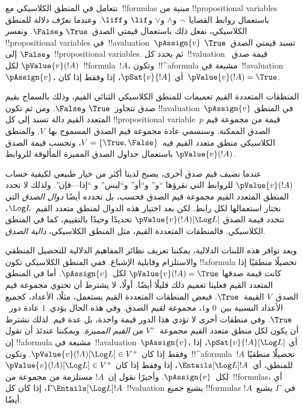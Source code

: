 \documentclass[../../../include/open-logic-section]{subfiles}
\begin{document}


نتعامل في المنطق الكلاسيكي مع~!!{formula}s مبنية من
!!{propositional variable}s باستعمال روابط القضايا~$\lnot$ و$\land$
و$\lor$ و$\lif$ و$\liff$. وعندما نعرّف دلالة للمنطق الكلاسيكي، نفعل
ذلك باستعمال قيمتي الصدق~$\True$ و$\False$. ونفسر
!!{propositional variable}s في~!!a{valuation}~$\pAssign{v}$ تسند
قيمتي الصدق~$\True$ و$\False$ إلى~!!{propositional variable}s. ثم يحدد
كل~!!{valuation} قيمة صدق~$\pValue{v}(!A)$ لكل~!!{formula}~$!A$،
وتكون~!!^a{formula} مشبعة في~!!a{valuation}~$\pAssign{v}$، أي
$\pSat{v}{!A}$، إذا وفقط إذا كان~$\pValue{v}(!A) = \True$.

المنطقات المتعددة القيم تعميمات للمنطق الكلاسيكي الثنائي القيم، وذلك
بالسماح بقيم صدق تتجاوز~$\True$ و$\False$. ومن ثم تكون
!!a{valuation}~$\pAssign{v}$ في المنطق المتعدد القيم دالة تسند إلى كل
!!{propositional variable}~$p$ قيمة من مجموعة قيم الصدق الممكنة.
وسنسمي عادة مجموعة قيم الصدق المسموح بها~$V$. والمنطق الكلاسيكي منطق
متعدد القيم فيه~$V = \{\True, \False\}$، وتحسب قيمة الصدق
$\pValue{v}(!A)$ باستعمال جداول الصدق المميزة المألوفة للروابط.

عندما نضيف قيم صدق أخرى، يصبح لدينا أكثر من خيار طبيعي لكيفية حساب
$\pValue{v}(!A)$ للروابط التي نقرؤها ``و'' و``أو'' و``ليس'' و
``إذا---فإن''. ولذلك لا تحدد المنطق المتعدد القيم مجموعة قيم الصدق
فحسب، بل تحدده أيضًا \emph{دوال الصدق} التي نختار استعمالها لكل رابط.
لكن بعد اختيار هذه الدوال لمنطق متعدد القيم~$\Log L$، تتحدد قيمة الصدق
$\pValue{v}(!A)[\Log L]$ تحديدًا وحيدًا بالتقييم، كما في المنطق
الكلاسيكي. فالمنطقات المتعددة القيم، مثل المنطق الكلاسيكي،
\emph{دالية الصدق}.

وبعد توافر هذه اللبنات الدلالية، يمكننا تعريف نظائر المفاهيم الدلالية
للتحصيل المنطقي والاستلزام وقابلية الإشباع. ففي المنطق الكلاسيكي تكون
!!a{formula} تحصيلًا منطقيًا إذا كانت قيمة صدقها
$\pValue{v}(!A) = \True$ لكل~$\pAssign{v}$. أما في المنطق المتعدد
القيم فعلينا تعميم ذلك قليلًا أيضًا. أولًا، لا يشترط أن تحتوي مجموعة
قيم الصدق~$V$ القيمة~$\True$. فبعض المنطقات المتعددة القيم يستعمل،
مثلًا، الأعداد، كجميع الأعداد النسبية بين~$0$ و$1$، مجموعة لقيم الصدق.
وفي هذه الحال يؤدي~$1$ عادة دور~$\True$. وفي منطقات أخرى لا تؤدي هذا
الدور قيمة واحدة، بل عدة قيم. لذلك نشترط أن يكون لكل منطق متعدد القيم
مجموعة~$V^+$ من \emph{القيم المميزة}. ويمكننا عندئذ أن نقول إن
!!a{formula} مشبعة في~!!a{valuation}~$\pAssign{v}$، أي
$\pSat{v}{!A}[\Log L]$، إذا وفقط إذا كان
$\pValue{v}(!A)[\Log L] \in V^+$. وتكون~!!^a{formula}~$!A$ تحصيلًا
منطقيًا للمنطق، أي~$\Entails[\Log L] !A$، إذا وفقط إذا كان
$\pValue{v}(!A)[\Log L] \in V^+$ لكل~$\pAssign{v}$. وأخيرًا نقول إن~$!A$
مستلزمة من مجموعة من~!!{formula}s، أي
$\Gamma \Entails[\Log L] !A$، إذا كان كل~!!{valuation} يشبع جميع
!!{formula}s في~$\Gamma$ يشبع~$!A$ أيضًا.
\end{document}
